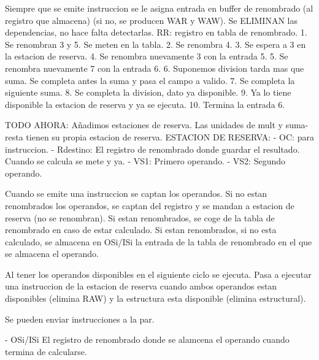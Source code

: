 Siempre que se emite instruccion se le asigna entrada en buffer de renombrado (al registro que almacena) (si no, se producen WAR y WAW). Se ELIMINAN las dependencias, no hace falta detectarlas.
RR: registro en tabla de renombrado.
1. Se renombran 3 y 5. Se meten en la tabla.
2. Se renombra 4.
3. Se espera a 3 en la estacion de reserva.
4. Se renombra nuevamente 3 con la entrada 5.
5. Se renombra nuevamente 7 con la entrada 6.
6. Suponemos division tarda mas que suma. Se completa antes la suma y pasa el campo a valido.
7. Se completa la siguiente suma.
8. Se completa la division, dato ya disponible.
9. Ya lo tiene disponible la estacion de reserva y ya se ejecuta.
10. Termina la entrada 6.

TODO AHORA:
Añadimos estaciones de reserva. Las unidades de mult y suma-resta tienen su propia estacion de reserva.
ESTACION DE RESERVA:
- OC: para instruccion.
- Rdestino: El registro de renombrado donde guardar el resultado. Cuando se calcula se mete y ya.
- VS1: Primero operando.
- VS2: Segundo operando.

Cuando se emite una instruccion se captan los operandos.
Si no estan renombrados los operandos, se captan del registro y se mandan a estacion de reserva (no se renombran).
Si estan renombrados, se coge de la tabla de renombrado en caso de estar calculado.
Si estan renombrados, si no esta calculado, se almacena en OSi/ISi la entrada de la tabla de renombrado en el que se almacena el operando.

Al tener los operandos disponibles en el siguiente ciclo se ejecuta.
Pasa a ejecutar una instruccion de la estacion de reserva cuando ambos operandos estan disponibles (elimina RAW) y la estructura esta disponible (elimina estructural).

Se pueden enviar instrucciones a la par.

- OSi/ISi El registro de renombrado donde se alamcena el operando cuando termina de calcularse.
